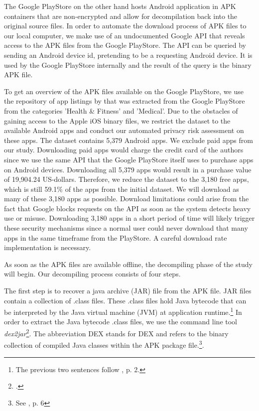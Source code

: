 \documentclass[
	a4paper,
	oneside,
	12pt,
	liststotocnumbered
]{article}
\let\cite\textcite
\begin{document}
The Google PlayStore on the other hand hosts Android application in \acs{APK} containers that are non-encrypted and allow for decompilation back into the original source files. 
In order to automate the download process of \acs{APK} files to our local computer, we make use of an undocumented Google \acs{API} that reveals access to the \acs{APK} files from the Google PlayStore. 
The \acs{API} can be queried by sending an Android device id, pretending to be a requesting Android device. It is used by the Google PlayStore internally and the result of the query is the binary \acs{APK} file.

To get an overview of the APK files available on the Google PlayStore, we use the repository of app listings by \cite{Xu2015} that was extracted from the Google PlayStore from the categories 'Health \& Fitness' and 'Medical'.
Due to the obstacles of gaining access to the Apple iOS binary files, we restrict the dataset to the available Android apps and conduct our automated privacy risk assessment on these apps.
The \cite{Xu2015} dataset contains 5,379 Android apps. 
We exclude paid apps from our study. Downloading paid apps would charge the credit card of the authors since we use the same \acs{API} that the Google PlayStore itself uses to purchase apps on Android devices. 
Downloading all 5,379 apps would result in a purchase value of 19,904.24 US-dollars. 
Therefore, we reduce the dataset to the 3,180 free apps, which is still 59.1\% of the apps from the initial dataset. 
We will download as many of these 3,180 apps as possible.
Download limitations could arise from the fact that Google blocks requests on the API as soon as the system detects heavy use or misuse. 
Downloading 3,180 apps in a short period of time will likely trigger these security mechanisms since a normal user could never download that many apps in the same timeframe from the PlayStore.
A careful download rate implementation is necessary.

As soon as the \acs{APK} files are available offline, the decompiling phase of the study will begin.
Our decompiling process consists of four steps.

The first step is to recover a java archive (\acs{JAR}) file from the \acs{APK} file.
\acs{JAR} files contain a collection of .class files. 
These .class files hold Java bytecode that can be interpreted by the Java virtual machine (\acs{JVM}) at application runtime.\footnote{The previous two sentences follow \cite{Enck2011}, p. 2.} 
In order to extract the Java bytecode .class files, we use the command line tool \textit{dex2jar}\footnote{\cite{Pan2010}.}. 
The abbreviation \acs{DEX} stands for \acl{DEX} and refers to the binary collection of compiled Java classes within the \acs{APK} package file.\footnote{See \cite{xu2013}, p. 6}.
\end{document}
